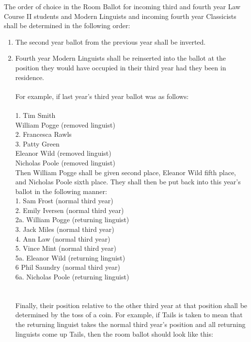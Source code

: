 \npara \label{AppP:RoomIncomingThird} The order of choice in the Room Ballot for incoming third and fourth year Law Course II students and Modern Linguists and incoming fourth year Classicists shall be determined in the following order:
\begin{enumerate}
\item The second year ballot from the previous year shall be inverted.
\item Fourth year Modern Linguists shall be reinserted into the ballot at the position they would have occupied in their third year had they been in residence. \\ \\
For example, if last year's third year ballot was as follows:\\ \\
1. Tim Smith\\
William Pogge (removed linguist)\\
2. Francesca Rawls\\
3. Patty Green\\
Eleanor Wild (removed linguist)\\
Nicholas Poole (removed linguist)\\
Then William Pogge shall be given second place, Eleanor Wild fifth place, and Nicholas Poole sixth place. They shall then be put back into this year's ballot in the following manner:\\
1.	Sam Frost (normal third year)\\
2.	Emily Iversen (normal third year)\\
2a. William Pogge (returning linguist)\\
3.	Jack Miles (normal third year)\\
4.	Ann Law (normal third year)\\
5.	Vince Mint (normal third year)\\
5a. Eleanor Wild (returning linguist)\\
6	Phil Saundry (normal third year)\\
6a. Nicholas Poole (returning linguist)\\ \\ \\
Finally, their position relative to the other third year at that position shall be determined by the toss of a coin. For example, if Tails is taken to mean that the returning linguist takes the normal third year's position and all returning linguists come up Tails, then the room ballot should look like this:\\ \\

\end{enumerate}
